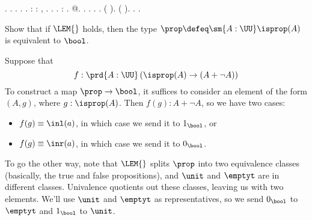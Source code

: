 \begin{coqdoccode}
\coqdocindent{1.00em}
 .  .  .  .\coqdoceol
\coqdocnoindent
{}.\coqdoceol
\coqdocemptyline
\coqdocnoindent
{}  : \coqdockw{\ensuremath{\forall}}   :  ,  \coqdocnotation{=} .\coqdoceol
\coqdocindent{1.00em}
 .\coqdoceol
\coqdocnoindent
{}.\coqdoceol
\coqdocemptyline
\coqdocnoindent
{}  : \coqdocnotation{(} \coqdocnotation{)} \coqdocnotation{\ensuremath{\eqvsym}} .\coqdoceol
\coqdocindent{1.00em}
 @.\coqdoceol
\coqdocindent{1.00em}
 .  .\coqdoceol
\coqdocindent{1.00em}
 .  .\coqdoceol
\coqdocindent{1.00em}
 (  ).\coqdoceol
\coqdocindent{1.00em}
 (  ).\coqdoceol
\coqdocnoindent
{}.\coqdoceol
\coqdocemptyline
\coqdocnoindent
{} .\coqdoceol
\coqdocemptyline
\end{coqdoccode}
Show that if $\LEM{}$ holds, then the type $\prop \defeq \sm{A:\UU}\isprop(A)$
is equivalent to $\bool$.


 \soln
Suppose that 
\[
  f : \prd{A:\UU}\left(\isprop(A) \to (A + \lnot A)\right)
\]
To construct a map $\prop \to \bool$, it suffices to consider an element of the
form $(A, g)$, where $g : \isprop(A)$.  Then $f(g) : A + \lnot A$, so we have
two cases:



\begin{itemize}
\item  $f(g) \equiv \inl(a)$, in which case we send it to $1_{\bool}$, or

\item  $f(g) \equiv \inr(a)$, in which case we send it to $0_{\bool}$.

\end{itemize}
To go the other way, note that $\LEM{}$ splits $\prop$ into two equivalence
classes (basically, the true and false propositions), and $\unit$ and $\emptyt$
are in different classes.  Univalence quotients out these classes, leaving us
with two elements.  We'll use $\unit$ and $\emptyt$ as representatives, so we
send $0_{\bool}$ to $\emptyt$ and $1_{\bool}$ to $\unit$.


